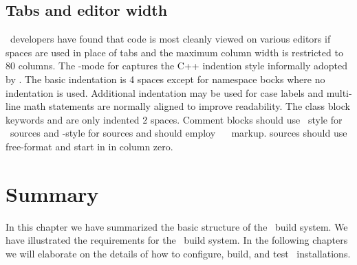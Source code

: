 \subsection{Tabs and editor width}
\label{sec:cc-tabs}

\draco\ developers have found that code is most cleanly viewed on various editors if spaces are used in place of tabs and the maximum column width is restricted to 80 columns.  The \draco-mode for  captures the C++ indention style informally adopted by \draco.  The basic indentation is 4 spaces except for namespace bocks where no indentation is used.  Additional indentation may be used for case labels and multi-line math statements are normally aligned to improve readability.  The class block keywords  and  are only indented 2 spaces. Comment blocks should use \cpp\ style for \cpp\ sources and -style for  sources and should employ \doxygen\ ~\cite{doxygen} markup.   sources should use free-format and start in in column zero.


\section{Summary}

In this chapter we have summarized the basic structure of the \draco\ 
build system.  We have illustrated the requirements for the \draco\ 
build system.  In the following chapters we will elaborate on the
details of how to configure, build, and test \draco\ installations.

